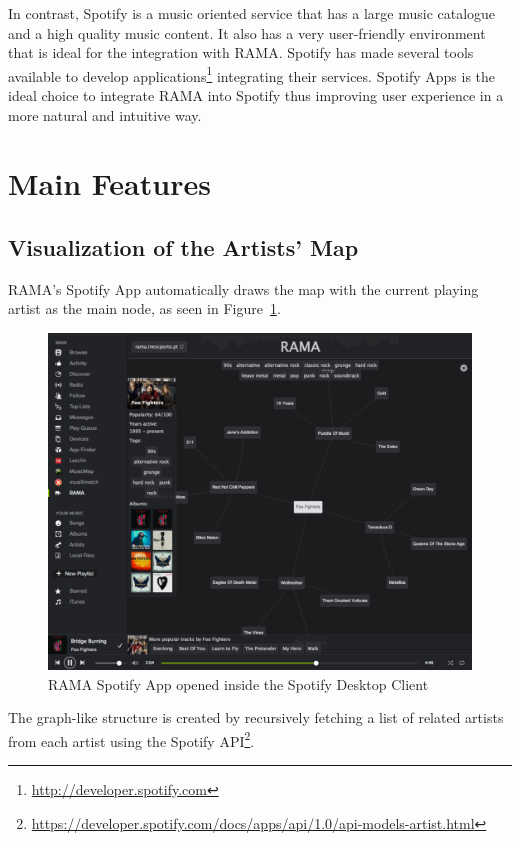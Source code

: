 \documentclass{article}
\begin{document}
  In contrast, Spotify is a music oriented service that has a large music catalogue and a high quality music content.
  It also has a very user-friendly environment that is ideal for the integration with RAMA.
  Spotify has made several tools available to develop applications\footnote{\url{http://developer.spotify.com}} integrating their services.
  Spotify Apps is the ideal choice to integrate RAMA into Spotify thus improving user experience in a more natural and intuitive way.

  \section{Main Features}
  \label{sec:features}

    \subsection{Visualization of the Artists' Map}
    \label{sub:visualization}

      RAMA's Spotify App automatically draws the map with the current playing artist as the main node, as seen in Figure~\ref{fig:spotify_app}.
      \begin{figure}[hb]
        \begin{center}
          \includegraphics[width=\columnwidth]{../report/figures/graph_rootnode.pdf}
        \end{center}
        \caption{RAMA Spotify App opened inside the Spotify Desktop Client}
        \label{fig:spotify_app}
      \end{figure}
      The graph-like structure is created by recursively fetching a list of related artists from each artist using the Spotify API\footnote{\url{https://developer.spotify.com/docs/apps/api/1.0/api-models-artist.html}}.
\end{document}
